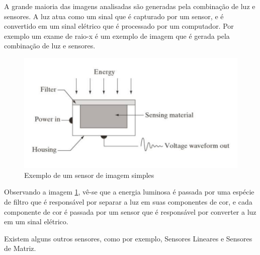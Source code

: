 \documentclass[12pt]{article}
\begin{document}
    A grande maioria das imagens analisadas são generadas pela combinação de luz e sensores. A luz
    atua como um sinal que é capturado por um sensor, e é convertido em um sinal elétrico que é
    processado por um computador. Por exemplo um exame de raio-x é um exemplo de imagem que é gerada
    pela combinação de luz e sensores.

    \begin{figure}[H]
        \centering
        \includegraphics[]{images/16.png}
        \caption{Exemplo de um sensor de imagem simples}
        \label{fig:sensor}
    \end{figure}

    Observando a imagem \ref{fig:sensor}, vê-se que a energia luminosa é passada por uma espécie de filtro que
    é responsável por separar a luz em suas componentes de cor, e cada componente de cor é passada
    por um sensor que é responsável por converter a luz em um sinal elétrico.

    Existem alguns outros sensores, como por exemplo, Sensores Lineares e Sensores de Matriz.
\end{document}
